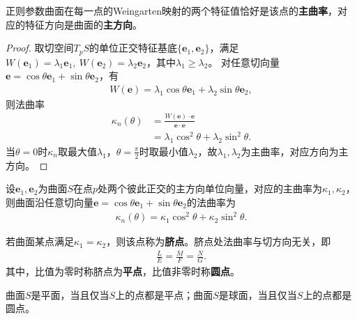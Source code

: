 \documentclass[../../main.tex]{subfiles}%
\begin{document}
\begin{theorem}
正则参数曲面在每一点的Weingarten映射的两个特征值恰好是该点的\textbf{主曲率}，对应的特征方向是曲面的\textbf{主方向}。
\end{theorem}
\begin{proof}
取切空间$T_pS$的单位正交特征基底$\{\boldsymbol{e}_1,\boldsymbol{e}_2\}$，满足$W(\boldsymbol{e}_1)=\lambda_1\boldsymbol{e}_1,\ W(\boldsymbol{e}_2)=\lambda_2\boldsymbol{e}_2$，其中$\lambda_1\geqslant\lambda_2$。
对任意切向量$\boldsymbol{e}=\cos\theta\boldsymbol{e}_1+\sin\theta\boldsymbol{e}_2$，有
\begin{align*}
W(\boldsymbol{e})=\lambda_1\cos\theta\boldsymbol{e}_1+\lambda_2\sin\theta\boldsymbol{e}_2,
\end{align*}
则法曲率
\begin{align*}
\kappa_n(\theta)&=\frac{W(\boldsymbol{e})\cdot\boldsymbol{e}}{\boldsymbol{e}\cdot\boldsymbol{e}}\\
&=\lambda_1\cos^2\theta+\lambda_2\sin^2\theta.
\end{align*}
当$\theta=0$时$\kappa_n$取最大值$\lambda_1$，$\theta=\frac{\pi}{2}$时取最小值$\lambda_2$，故$\lambda_1,\lambda_2$为主曲率，对应方向为主方向。
\end{proof}

\begin{theorem}[Euler公式]
设$\boldsymbol{e}_1,\boldsymbol{e}_2$为曲面$S$在点$p$处两个彼此正交的主方向单位向量，对应的主曲率为$\kappa_1,\kappa_2$，则曲面沿任意切向量$\boldsymbol{e}=\cos\theta\boldsymbol{e}_1+\sin\theta\boldsymbol{e}_2$的法曲率为
\begin{align}
\kappa_n(\theta)=\kappa_1\cos^2\theta+\kappa_2\sin^2\theta.\label{eq:euler_formula}
\end{align}
\end{theorem}

\begin{definition}
若曲面某点满足$\kappa_1=\kappa_2$，则该点称为\textbf{脐点}。脐点处法曲率与切方向无关，即
\begin{align}
\frac{L}{E}=\frac{M}{F}=\frac{N}{G}.\label{eq:umbilical_point}
\end{align}
其中，比值为零时称脐点为\textbf{平点}，比值非零时称\textbf{圆点}。
\end{definition}

\begin{proposition}
曲面$S$是平面，当且仅当$S$上的点都是平点；曲面$S$是球面，当且仅当$S$上的点都是圆点。
\end{proposition}
\end{document}

